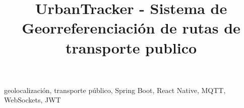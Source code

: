 \documentclass[conference]{IEEEtran}
\begin{document}
\title{UrbanTracker - Sistema de Georreferenciación de rutas de transporte publico}

\author{
}

\maketitle

\begin{abstract}

\end{abstract}

\begin{IEEEkeywords}
geolocalización, transporte público, Spring Boot, React Native, MQTT, WebSockets, JWT
\end{IEEEkeywords}










\printbibliography
\end{document}
